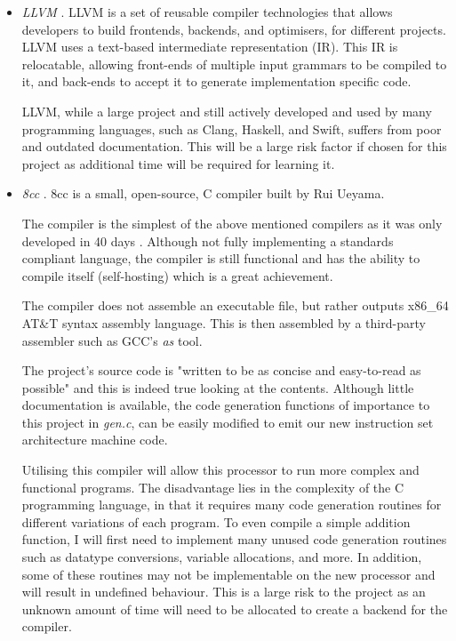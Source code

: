 \documentclass[11pt,a4paper]{report}
\begin{document}
\begin{itemize}
\item{\textit{LLVM} \cite{llvm}. LLVM is a set of reusable compiler technologies that allows developers to build frontends, backends, and optimisers, for different projects. LLVM uses a text-based intermediate representation (IR). This IR is relocatable, allowing front-ends of multiple input grammars to be compiled to it, and back-ends to accept it to generate implementation specific code. 

LLVM, while a large project and still actively developed and used by many programming languages, such as Clang, Haskell, and Swift, suffers from poor and outdated documentation. This will be a large risk factor if chosen for this project as additional time will be required for learning it.
}


\item{\textit{8cc} \cite{8ccgithub}. 8cc is a small, open-source, C compiler built by Rui Ueyama.

The compiler is the simplest of the above mentioned compilers as it was only developed in 40 days \cite{8cc}. Although not fully implementing a standards compliant language,  the compiler is still functional and has the ability to compile itself (self-hosting) which is a great achievement.

The compiler does not assemble an executable file, but rather outputs x86\_64 AT\&T syntax assembly language. This is then assembled by a third-party assembler such as GCC's \textit{as} tool.

The project's source code is "written to be as concise and easy-to-read as possible" \cite{8cc} and this is indeed true looking at the contents. Although little documentation is available, the code generation functions of importance to this project in \textit{gen.c}, can be easily modified to emit our new instruction set architecture machine code.

Utilising this compiler will allow this processor to run more complex and functional programs. The disadvantage lies in the complexity of the C programming language, in that it requires many code generation routines for different variations of each program. To even compile a simple addition function, I will first need to implement many unused code generation routines such as datatype conversions, variable allocations, and more. In addition, some of these routines may not be implementable on the new processor and will result in undefined behaviour. This is a large risk to the project as an unknown amount of time will need to be allocated to create a backend for the compiler.
}
\end{itemize}
\end{document}
